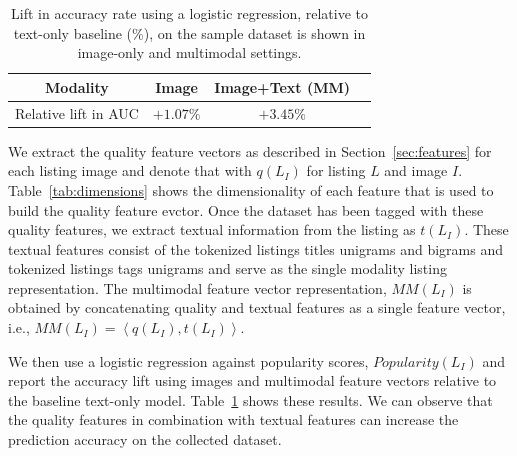 \documentclass[conference,a4paper]{IEEEtran}
\begin{document}
\begin{table}[h!]
   \label{tab:results}
   \caption{Lift in accuracy rate using a logistic regression, relative to text-only baseline ($\%$), on the sample dataset is shown in image-only and multimodal settings.}
    \begin{center}
\begin{tabular}{|c||c|c|c|} 
\hline
Modality&Image&Image+Text (MM)\\
\hline
 \hline
Relative lift in AUC& $+1.07\%$ &$+\mathbf{3.45}\%$\\ \hline
 \end{tabular}
 \label{tab:results}
   \end{center}
\end{table}


\newcommand{\tuple}[1]{\ensuremath{\left \langle #1 \right \rangle }}


We extract the quality feature vectors as described in Section~\ref{sec:features} for each listing image and denote that with $q(L_I)$ for listing $L$ and image $I$. Table~\ref{tab:dimensions} shows the dimensionality of each feature that is used to build the quality feature evctor. Once the dataset has been tagged with these quality features, we extract textual information from the
listing as $t(L_I)$. These textual features consist of the tokenized listings
titles unigrams and bigrams and tokenized listings
tags unigrams and serve as the single modality listing representation. The multimodal feature vector representation, $MM(L_I)$ is obtained by concatenating quality and textual features as a single feature vector, i.e., $MM(L_I) = \tuple{q(L_I),t(L_I)}$. 

We then use a logistic regression against popularity scores, $Popularity(L_I)$ 
and report the accuracy lift using images and multimodal feature vectors relative to the baseline text-only model. Table~\ref{tab:results} shows these results. We can observe that the quality features in combination with textual features can increase the prediction accuracy on the collected dataset.  
\end{document}
